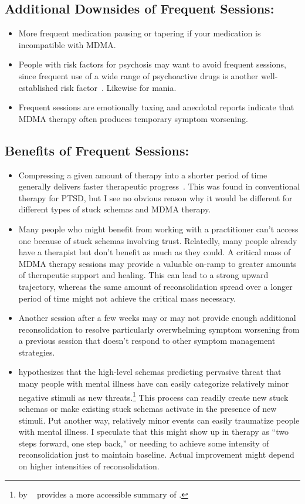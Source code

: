\documentclass[11pt,oneside]{book}
\let\cite\parencite
\newcommand{\prosecite}[1]{\citetitle{#1} by \citefullauthor{#1}~\cite{#1}}
\begin{document}
\subsection*{Additional Downsides of Frequent Sessions:}
\begin{itemize}
    \item More frequent medication pausing or tapering if your medication is incompatible with MDMA.
    \item People with risk factors for psychosis may want to avoid frequent sessions, since frequent use of a wide range of psychoactive drugs is another well-established risk factor~\cite{drugsPsychosis}. Likewise for mania.
    \item Frequent sessions are emotionally taxing and anecdotal reports indicate that MDMA therapy often produces temporary symptom worsening.
\end{itemize}

\subsection*{Benefits of Frequent Sessions:}
\begin{itemize}
    \item Compressing a given amount of therapy into a shorter period of time generally delivers faster therapeutic progress~\cite{dellMassed,ehlersMassed,foaMAssed}. This was found in conventional therapy for PTSD, but I see no obvious reason why it would be different for different types of stuck schemas and MDMA therapy.
    \item Many people who might benefit from working with a practitioner can't access one because of stuck schemas involving trust. Relatedly, many people already have a therapist but don't benefit as much as they could. A critical mass of MDMA therapy sessions may provide a valuable on-ramp to greater amounts of therapeutic support and healing. This can lead to a strong upward trajectory, whereas the same amount of reconsolidation spread over a longer period of time might not achieve the critical mass necessary.
    \item Another session after a few weeks may or may not provide enough additional reconsolidation to resolve particularly overwhelming symptom worsening from a previous session that doesn't respond to other symptom management strategies.
    \item \textcite{berghBSTS} hypothesizes that the high-level schemas predicting pervasive threat that many people with mental illness have can easily categorize relatively minor negative stimuli as new threats.\footnote{\prosecite{alexanderPrecision} provides a more accessible summary of \textcite{berghBSTS}.} This process can readily create new stuck schemas or make existing stuck schemas activate in the presence of new stimuli. Put another way, relatively minor events can easily traumatize people with mental illness. I speculate that this might show up in therapy as \enquote{two steps forward, one step back,} or needing to achieve some intensity of reconsolidation just to maintain baseline. Actual improvement might depend on higher intensities of reconsolidation.
\end{itemize}
\end{document}

